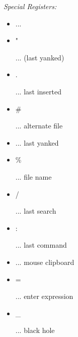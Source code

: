 \textit{Special Registers:}\\
\begin{itemize}
    \item \begin{code}\textquotedbl@\end{code} ... 
    \item \begin{code}\textquotedbl"\end{code} ...  (last yanked)
    \item \begin{code}\textquotedbl.\end{code} ... last inserted
    \item \begin{code}\textquotedbl\#\end{code} ... alternate file
    \item \begin{code}\end{code} ... last yanked
    \item \begin{code}\textquotedbl\%\end{code} ... file name
    \item \begin{code}\textquotedbl/\end{code} ... last search
    \item \begin{code}\textquotedbl:\end{code} ... last command
    \item \begin{code}\textquotedbl*\end{code} ... mouse clipboard
    \item \begin{code}\textquotedbl=\end{code} ... enter expression
    \item \begin{code}\textquotedbl\_\end{code} ... black hole
\end{itemize}
\ \\